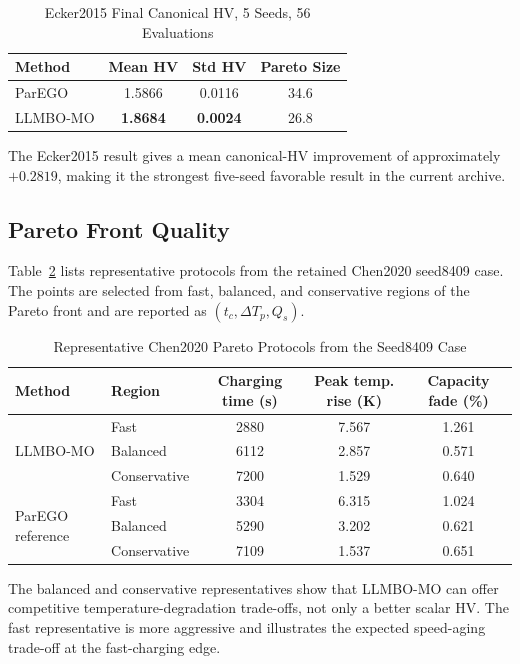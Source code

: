 \documentclass[journal]{IEEEtran}
\begin{document}
\begin{table}[htbp]
\caption{Ecker2015 Final Canonical HV, 5 Seeds, 56 Evaluations}
\label{tab:ecker}
\centering
\begin{tabular}{lccc}
\toprule
Method & Mean HV & Std HV & Pareto Size \\
\midrule
ParEGO & 1.5866 & 0.0116 & 34.6 \\
LLMBO-MO & \textbf{1.8684} & \textbf{0.0024} & 26.8 \\
\bottomrule
\end{tabular}
\end{table}

The Ecker2015 result gives a mean canonical-HV improvement of approximately
$+0.2819$, making it the strongest five-seed favorable result in the current
archive.

\subsection{Pareto Front Quality}

Table~\ref{tab:protocols} lists representative protocols from the retained
Chen2020 seed8409 case. The points are selected from fast, balanced, and
conservative regions of the Pareto front and are reported as
$(t_c,\Delta T_p,Q_s)$.

\begin{table}[htbp]
\caption{Representative Chen2020 Pareto Protocols from the Seed8409 Case}
\label{tab:protocols}
\centering
\begin{tabular}{llccc}
\toprule
Method & Region & Charging time (s) & Peak temp. rise (K) & Capacity fade (\%) \\
\midrule
\multirow{3}{*}{LLMBO-MO}
& Fast & 2880 & 7.567 & 1.261 \\
& Balanced & 6112 & 2.857 & 0.571 \\
& Conservative & 7200 & 1.529 & 0.640 \\
\midrule
\multirow{3}{*}{ParEGO reference}
& Fast & 3304 & 6.315 & 1.024 \\
& Balanced & 5290 & 3.202 & 0.621 \\
& Conservative & 7109 & 1.537 & 0.651 \\
\bottomrule
\end{tabular}
\end{table}

The balanced and conservative representatives show that LLMBO-MO can offer
competitive temperature-degradation trade-offs, not only a better scalar HV.
The fast representative is more aggressive and illustrates the expected
speed-aging trade-off at the fast-charging edge.
\end{document}
